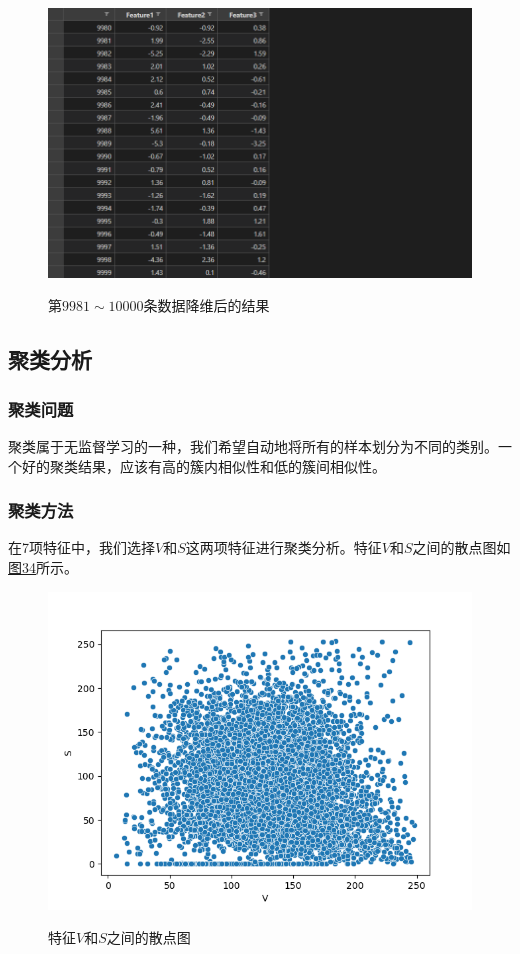 \documentclass[UTF8]{ctexart}
\begin{document}
	\begin{figure}[htbp]
		\centering
		\caption{第$9981\sim10000$条数据降维后的结果}
		\includegraphics[width=1.0\textwidth]{data_pca2.png}
		\label{Fig.33}
	\end{figure}
	
	\subsection{聚类分析} 
	
	\subsubsection{聚类问题} 聚类属于无监督学习的一种，我们希望自动地将所有的样本划分为不同的类别。一个好的聚类结果，应该有高的簇内相似性和低的簇间相似性。
	
	\subsubsection{聚类方法} 在7项特征中，我们选择$V$和$S$这两项特征进行聚类分析。特征$V$和$S$之间的散点图如\hyperref[Fig.34]{图34}所示。
	
	\begin{figure}[htbp]
		\centering
		\caption{特征$V$和$S$之间的散点图}
		\includegraphics[width=1.0\textwidth]{scatter_v_s.png}
		\label{Fig.34}
	\end{figure}
\end{document}
